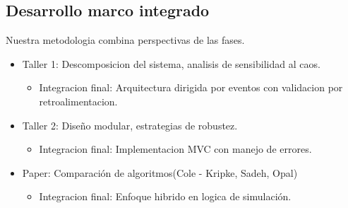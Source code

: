 \documentclass[conference]{IEEEtran}
\begin{document}
\subsection{Desarrollo marco integrado}
Nuestra metodologia combina perspectivas de las fases.
\begin{itemize}
    \item Taller 1: Descomposicion del sistema, analisis de sensibilidad al caos.
    \begin{itemize}
        \item Integracion final: Arquitectura dirigida por eventos con validacion por retroalimentacion.
    \end{itemize}
    \item Taller 2: Diseño modular, estrategias de robustez.
    \begin{itemize}
        \item Integracion final: Implementacion MVC con manejo de errores.
    \end{itemize}
    \item Paper: Comparación de algoritmos(Cole - Kripke, Sadeh, Opal)
    \begin{itemize}
        \item Integracion final: Enfoque hibrido en logica de simulación.
    \end{itemize}
\end{itemize}
\end{document}
